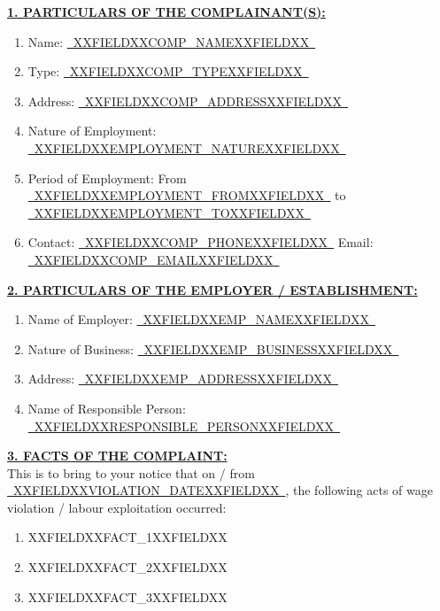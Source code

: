 \documentclass[12pt,a4paper]{article}
\newcommand{\fillline}[1]{\underline{~#1~}}
\begin{document}
\vspace{1em}

\noindent\textbf{\uline{1. PARTICULARS OF THE COMPLAINANT(S):}}
\begin{enumerate}[label=(\alph*)]
    \item Name: \fillline{XXFIELDXXCOMP_NAMEXXFIELDXX}
    \item Type: \fillline{XXFIELDXXCOMP_TYPEXXFIELDXX}
    \item Address: \fillline{XXFIELDXXCOMP_ADDRESSXXFIELDXX}
    \item Nature of Employment: \fillline{XXFIELDXXEMPLOYMENT_NATUREXXFIELDXX}
    \item Period of Employment: From \fillline{XXFIELDXXEMPLOYMENT_FROMXXFIELDXX} to \fillline{XXFIELDXXEMPLOYMENT_TOXXFIELDXX}
    \item Contact: \fillline{XXFIELDXXCOMP_PHONEXXFIELDXX} \quad Email: \fillline{XXFIELDXXCOMP_EMAILXXFIELDXX}
\end{enumerate}

\vspace{1em}

\noindent\textbf{\uline{2. PARTICULARS OF THE EMPLOYER / ESTABLISHMENT:}}
\begin{enumerate}[label=(\alph*)]
    \item Name of Employer: \fillline{XXFIELDXXEMP_NAMEXXFIELDXX}
    \item Nature of Business: \fillline{XXFIELDXXEMP_BUSINESSXXFIELDXX}
    \item Address: \fillline{XXFIELDXXEMP_ADDRESSXXFIELDXX}
    \item Name of Responsible Person: \fillline{XXFIELDXXRESPONSIBLE_PERSONXXFIELDXX}
\end{enumerate}

\vspace{1em}

\noindent\textbf{\uline{3. FACTS OF THE COMPLAINT:}}\\
This is to bring to your notice that on / from \fillline{XXFIELDXXVIOLATION_DATEXXFIELDXX}, the
following acts of wage violation / labour exploitation occurred:

\vspace{0.5em}
\begin{enumerate}[label=(\alph*)]
    \item XXFIELDXXFACT_1XXFIELDXX
    \item XXFIELDXXFACT_2XXFIELDXX
    \item XXFIELDXXFACT_3XXFIELDXX
\end{enumerate}
\end{document}
